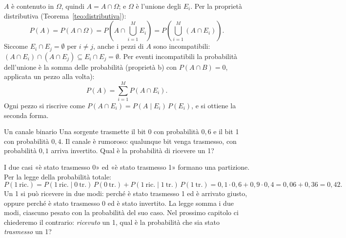 \begin{dimostrazione}
 $A$ è contenuto in $\Omega$, quindi $A = A \cap \Omega$; e $\Omega$ è
l'unione degli $E_i$. Per la proprietà distributiva (Teorema~\ref{teo:distributiva}):
\[ P(A) = P(A \cap \Omega) = P\left( A \cap \bigcup_{i=1}^{M} E_i \right) = P\left( \bigcup_{i=1}^{M} (A \cap E_i)
   \right) . \]
 Siccome $E_i \cap E_j = \emptyset$ per $i \neq j$, anche i pezzi di $A$ sono
incompatibili: $(A \cap E_i) \cap (A \cap E_j) \subseteq E_i \cap E_j = \emptyset$.
 Per eventi incompatibili la probabilità dell'unione è la somma delle probabilità
(proprietà b) con $P(A \cap B) = 0$, applicata un pezzo alla volta):
\[ P(A) = \sum_{i=1}^{M} P(A \cap E_i) . \]
 Ogni pezzo si riscrive come $P(A \cap E_i) = P(A \mid E_i)\, P(E_i)$, e si
ottiene la seconda forma.
\end{dimostrazione}

\begin{esempio}{Un canale binario}
Una sorgente trasmette il bit 0 con probabilità $0{,}6$ e il bit 1 con probabilità $0{,}4$. Il canale è rumoroso:
qualunque bit venga trasmesso, con probabilità $0{,}1$ arriva invertito. Qual è la probabilità di ricevere un 1?
\begin{center}
\end{center}
I due casi «è stato trasmesso 0» ed «è stato trasmesso 1» formano una partizione. Per la legge della probabilità
totale:
\[
  P(1\ \text{ric.}) = P(1\ \text{ric.} \mid 0\ \text{tr.})\, P(0\ \text{tr.}) + P(1\ \text{ric.} \mid 1\ \text{tr.})\,
  P(1\ \text{tr.}) = 0{,}1 \cdot 0{,}6 + 0{,}9 \cdot 0{,}4 = 0{,}06 + 0{,}36 = 0{,}42 .
\]
Un 1 si può ricevere in due modi: perché è stato trasmesso 1 ed è arrivato giusto, oppure perché è stato trasmesso 0
ed è stato invertito. La legge somma i due modi, ciascuno pesato con la probabilità del suo caso. Nel prossimo
capitolo ci chiederemo il contrario: \emph{ricevuto} un 1, qual è la probabilità che sia stato \emph{trasmesso} un 1?
\end{esempio}

